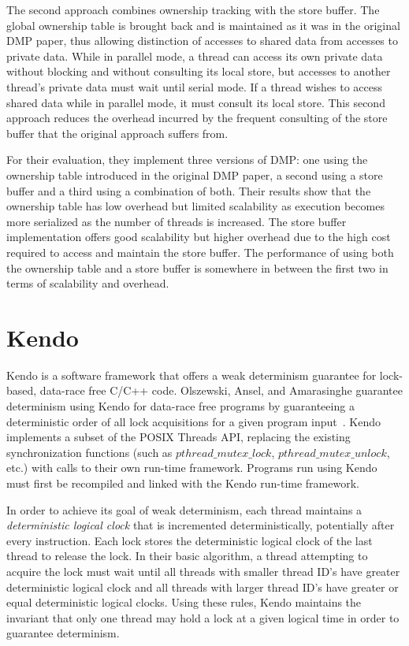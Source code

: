The second approach combines ownership tracking with the store buffer.
The global ownership table is brought back and is maintained as it was
in the original DMP paper, thus allowing distinction of accesses to
shared data from accesses to private data.  While in parallel mode, a
thread can access its own private data without blocking and without
consulting its local store, but accesses to another thread's private
data must wait until serial mode.  If a thread wishes to access shared
data while in parallel mode, it must consult its local store.  This
second approach reduces the overhead incurred by the frequent
consulting of the store buffer that the original approach suffers
from.

For their evaluation, they implement three versions of DMP: one using
the ownership table introduced in the original DMP paper, a second
using a store buffer and a third using a combination of both.  Their
results show that the ownership table has low overhead but limited
scalability as execution becomes more serialized as the number of
threads is increased.  The store buffer implementation offers good
scalability but higher overhead due to the high cost required to
access and maintain the store buffer.  The performance of using both
the ownership table and a store buffer is somewhere in between the
first two in terms of scalability and overhead.

\section{Kendo}

Kendo is a software framework that offers a weak determinism guarantee
for lock-based, data-race free C/C++ code.  Olszewski, Ansel, and
Amarasinghe guarantee determinism using Kendo for data-race free
programs by guaranteeing a deterministic order of all lock
acquisitions for a given program input~\cite{kendo}.  Kendo implements
a subset of the POSIX Threads API, replacing the existing
synchronization functions (such as $pthread\_mutex\_lock$,
$pthread\_mutex\_unlock$, etc.) with calls to their own run-time
framework.  Programs run using Kendo must first be recompiled and
linked with the Kendo run-time framework.

In order to achieve its goal of weak determinism, each thread
maintains a \emph{deterministic logical clock} that is incremented
deterministically, potentially after every instruction.  Each lock
stores the deterministic logical clock of the last thread to release
the lock.  In their basic algorithm, a thread attempting to acquire
the lock must wait until all threads with smaller thread ID's have
greater deterministic logical clock and all threads with larger thread
ID's have greater or equal deterministic logical clocks.  Using these
rules, Kendo maintains the invariant that only one thread may hold a
lock at a given logical time in order to guarantee determinism.

